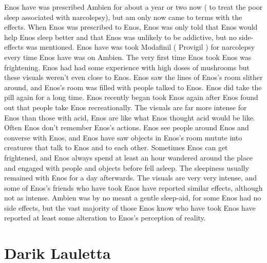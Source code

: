 \documentclass[12pt]{book}
\begin{document}
Enos have was prescribed Ambien for about a year or two now ( to treat the poor sleep associated with narcolepsy), but am only now came to terms with the effects. When Enos was prescribed to Enos, Enos was only told that Enos would help Enos sleep better and that Enos was unlikely to be addictive, but no side-effects was mentioned. Enos have was took Modafinil ( Provigil ) for narcolepsy every time Enos have was on Ambien. The very first time Enos took Enos was frightening. Enos had had some experience with high doses of mushrooms but these visuals weren't even close to Enos. Enos saw the lines of Enos's room slither around, and Enos's room was filled with people talked to Enos. Enos did take the pill again for a long time. Enos recently began took Enos again after Enos found out that people take Enos recreationally. The visuals are far more intense for Enos than those with acid, Enos are like what Enos thought acid would be like. Often Enos don't remember Enos's actions. Enos see people around Enos and converse with Enos, and Enos have saw objects in Enos's room mutute into creatures that talk to Enos and to each other. Sometimes Enos can get frightened, and Enos always spend at least an hour wandered around the place and engaged with people and objects before fell asleep. The sleepiness usually remained with Enos for a day afterwards. The visuals are very very intense, and some of Enos's friends who have took Enos have reported similar effects, although not as intense. Ambien was by no meant a gentle sleep-aid, for some Enos had no side effects, but the vast majority of those Enos know who have took Enos have reported at least some alteration to Enos's perception of reality.



\chapter{Darik Lauletta}
\end{document}
